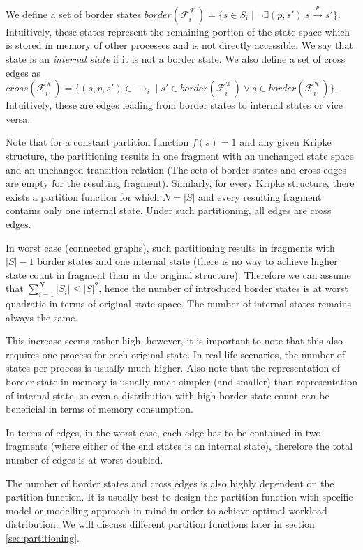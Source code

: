 \documentclass[12pt,oneside]{fithesis2}
\newcommand{\ks}[1][]{\ensuremath{\mathcal{K}_{#1}}}
\newcommand{\kf}[2]{\ensuremath{\mathcal{F}^{#2}_{#1}}}
\newcommand{\trans}[1]{\stackrel{#1}{\rightarrow}}
\begin{document}
			We define a set of border states $border(\kf{i}{\ks}) =  \{ s\in S_i \mid \neg \exists (p,s').s\trans{p}s'\}$. Intuitively, these states represent the remaining portion of the state space which is stored in memory of other processes and is not directly accessible. We say that state is an \emph{internal state} if it is not a border state. We also define a set of cross edges as $cross(\kf{i}{\ks}) = \{ (s, p, s') \in \trans{}_{i} \mid s' \in border(\kf{i}{\ks}) \vee s \in border(\kf{i}{\ks}) \}$. Intuitively, these are edges leading from border states to internal states or vice versa. 
			
			Note that for a constant partition function $f(s) = 1$ and any given Kripke structure, the partitioning results in one fragment with an unchanged state space and an unchanged transition relation (The sets of border states and cross edges are empty for the resulting fragment). Similarly, for every Kripke structure, there exists a partition function for which $N = |S|$ and every resulting fragment contains only one internal state. Under such partitioning, all edges are cross edges. 
			
			In worst case (connected graphs), such partitioning results in fragments with $|S| - 1$ border states and one internal state (there is no way to achieve higher state count in fragment than in the original structure). Therefore we can assume that $\sum\limits_{i=1}^N | S_i | \leq |S|^2 $, hence the number of introduced border states is at worst quadratic in terms of original state space. The number of internal states remains always the same.

			This increase seems rather high, however, it is important to note that this also requires one process for each original state. In real life scenarios, the number of states per process is usually much higher. Also note that the representation of border state in memory is usually much simpler (and smaller) than representation of internal state, so even a distribution with high border state count can be beneficial in terms of memory consumption. 
						
			In terms of edges, in the worst case, each edge has to be contained in two fragments (where either of the end states is an internal state), therefore the total number of edges is at worst doubled.			
			
			The number of border states and cross edges is also highly dependent on the partition function. It is usually best to design the partition function with specific model or modelling approach in mind in order to achieve optimal workload distribution. We will discuss different partition functions later in section \ref{sec:partitioning}. 
			
\end{document}
